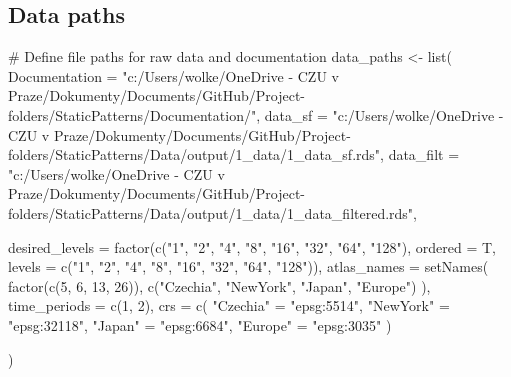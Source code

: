 \documentclass[
  letterpaper,
  DIV=11,
  numbers=noendperiod]{scrreprt}
\newenvironment{Shaded}{\begin{snugshade}}{\end{snugshade}}
\newcommand{\AttributeTok}[1]{\textcolor[rgb]{0.40,0.45,0.13}{#1}}
\newcommand{\CommentTok}[1]{\textcolor[rgb]{0.37,0.37,0.37}{#1}}
\newcommand{\DecValTok}[1]{\textcolor[rgb]{0.68,0.00,0.00}{#1}}
\newcommand{\FunctionTok}[1]{\textcolor[rgb]{0.28,0.35,0.67}{#1}}
\newcommand{\NormalTok}[1]{\textcolor[rgb]{0.00,0.23,0.31}{#1}}
\newcommand{\OtherTok}[1]{\textcolor[rgb]{0.00,0.23,0.31}{#1}}
\newcommand{\StringTok}[1]{\textcolor[rgb]{0.13,0.47,0.30}{#1}}
\begin{document}
\hypertarget{data-paths}{%
\subsection{Data paths}\label{data-paths}}

\begin{Shaded}
\begin{Highlighting}[]
\CommentTok{\# Define file paths for raw data and documentation}
\NormalTok{data\_paths }\OtherTok{\textless{}{-}} \FunctionTok{list}\NormalTok{(}
  \AttributeTok{Documentation =} \StringTok{"c:/Users/wolke/OneDrive {-} CZU v Praze/Dokumenty/Documents/GitHub/Project{-}folders/StaticPatterns/Documentation/"}\NormalTok{,}
  \AttributeTok{data\_sf =} \StringTok{"c:/Users/wolke/OneDrive {-} CZU v Praze/Dokumenty/Documents/GitHub/Project{-}folders/StaticPatterns/Data/output/1\_data/1\_data\_sf.rds"}\NormalTok{,}
  \AttributeTok{data\_filt =} \StringTok{"c:/Users/wolke/OneDrive {-} CZU v Praze/Dokumenty/Documents/GitHub/Project{-}folders/StaticPatterns/Data/output/1\_data/1\_data\_filtered.rds"}\NormalTok{, }

  \AttributeTok{desired\_levels =} \FunctionTok{factor}\NormalTok{(}\FunctionTok{c}\NormalTok{(}\StringTok{"1"}\NormalTok{, }\StringTok{"2"}\NormalTok{, }\StringTok{"4"}\NormalTok{, }\StringTok{"8"}\NormalTok{, }\StringTok{"16"}\NormalTok{, }\StringTok{"32"}\NormalTok{, }\StringTok{"64"}\NormalTok{, }\StringTok{"128"}\NormalTok{),}
    \AttributeTok{ordered =}\NormalTok{ T,}
    \AttributeTok{levels =} \FunctionTok{c}\NormalTok{(}\StringTok{"1"}\NormalTok{, }\StringTok{"2"}\NormalTok{, }\StringTok{"4"}\NormalTok{, }\StringTok{"8"}\NormalTok{, }\StringTok{"16"}\NormalTok{, }\StringTok{"32"}\NormalTok{, }\StringTok{"64"}\NormalTok{, }\StringTok{"128"}\NormalTok{)),}
    \AttributeTok{atlas\_names =} \FunctionTok{setNames}\NormalTok{(}
    \FunctionTok{factor}\NormalTok{(}\FunctionTok{c}\NormalTok{(}\DecValTok{5}\NormalTok{, }\DecValTok{6}\NormalTok{, }\DecValTok{13}\NormalTok{, }\DecValTok{26}\NormalTok{)),}
    \FunctionTok{c}\NormalTok{(}\StringTok{"Czechia"}\NormalTok{, }\StringTok{"NewYork"}\NormalTok{, }\StringTok{"Japan"}\NormalTok{, }\StringTok{"Europe"}\NormalTok{)}
\NormalTok{  ),}
  \AttributeTok{time\_periods =} \FunctionTok{c}\NormalTok{(}\DecValTok{1}\NormalTok{, }\DecValTok{2}\NormalTok{),}
  \AttributeTok{crs =} \FunctionTok{c}\NormalTok{(}
    \StringTok{"Czechia"} \OtherTok{=} \StringTok{"epsg:5514"}\NormalTok{,}
    \StringTok{"NewYork"} \OtherTok{=} \StringTok{"epsg:32118"}\NormalTok{,}
    \StringTok{"Japan"} \OtherTok{=} \StringTok{"epsg:6684"}\NormalTok{,}
    \StringTok{"Europe"} \OtherTok{=} \StringTok{"epsg:3035"}
\NormalTok{  )}

\NormalTok{)}
\end{Highlighting}
\end{Shaded}
\end{document}
